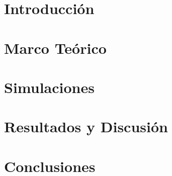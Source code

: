 \documentclass[a4paper,12pt]{report}
\begin{document}
 



\tableofcontents
\chapter{Introducción}

\chapter{Marco Teórico}

\chapter{Simulaciones}

\chapter{Resultados y Discusión}

\chapter{Conclusiones}


\end{document}
